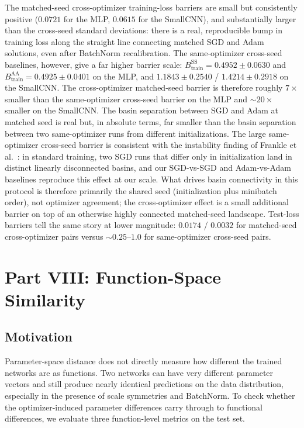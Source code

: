 The matched-seed cross-optimizer training-loss barriers are small but consistently positive ($0.0721$ for the MLP, $0.0615$ for the SmallCNN), and substantially larger than the cross-seed standard deviations: there is a real, reproducible bump in training loss along the straight line connecting matched SGD and Adam solutions, even after BatchNorm recalibration. The same-optimizer cross-seed baselines, however, give a far higher barrier scale: $B_{\text{train}}^{\mathrm{SS}} = 0.4952 \pm 0.0630$ and $B_{\text{train}}^{\mathrm{AA}} = 0.4925 \pm 0.0401$ on the MLP, and $1.1843 \pm 0.2540$ / $1.4214 \pm 0.2918$ on the SmallCNN. The cross-optimizer matched-seed barrier is therefore roughly $7\times$ smaller than the same-optimizer cross-seed barrier on the MLP and $\sim 20\times$ smaller on the SmallCNN. The basin separation between SGD and Adam at matched seed is real but, in absolute terms, far smaller than the basin separation between two same-optimizer runs from different initializations. The large same-optimizer cross-seed barrier is consistent with the instability finding of Frankle et al.~\cite{frankle2020linear}: in standard training, two SGD runs that differ only in initialization land in distinct linearly disconnected basins, and our SGD-vs-SGD and Adam-vs-Adam baselines reproduce this effect at our scale. What drives basin connectivity in this protocol is therefore primarily the shared seed (initialization plus minibatch order), not optimizer agreement; the cross-optimizer effect is a small additional barrier on top of an otherwise highly connected matched-seed landscape. Test-loss barriers tell the same story at lower magnitude: $0.0174$ / $0.0032$ for matched-seed cross-optimizer pairs versus $\sim 0.25$--$1.0$ for same-optimizer cross-seed pairs.

\FloatBarrier


\section{Part VIII: Function-Space Similarity}
\label{sec:function-space}

\subsection{Motivation}

Parameter-space distance does not directly measure how different the trained networks are as functions. Two networks can have very different parameter vectors and still produce nearly identical predictions on the data distribution, especially in the presence of scale symmetries and BatchNorm. To check whether the optimizer-induced parameter differences carry through to functional differences, we evaluate three function-level metrics on the test set.

